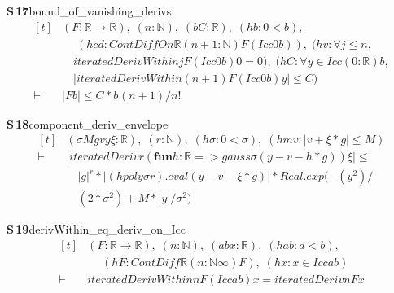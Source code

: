 \documentclass[conference]{IEEEtran}
\theoremstyle{definition}
\newcommand{\lean}[1]{\textsf{\footnotesize #1}}
\begin{document}
\noindent\textbf{S\,17}\quad\lean{bound\_of\_vanishing\_derivs}
{\footnotesize\[ \begin{aligned}[t]
&(\mathit{F} : \mathbb{R} \to \mathbb{R} ),\; (\mathit{n} : \mathbb{N} ),\; (\mathit{b} \mathit{C} : \mathbb{R} ),\; (\mathit{hb} : 0 < \mathit{b}),\\
&\quad \; (\mathit{hcd} : \mathit{ContDiffOn} \mathbb{R} (\mathit{n} + 1 : \mathbb{N} ) \mathit{F} (\mathit{Icc} 0 \mathit{b})),\; (\mathit{hv} : \forall \mathit{j} \leq \mathit{n},\\
&\quad \mathit{iteratedDerivWithin} \mathit{j} \mathit{F} (\mathit{Icc} 0 \mathit{b}) 0 = 0),\; (\mathit{hC} : \forall \mathit{y} \in \mathit{Icc} (0:\mathbb{R} ) \mathit{b},\\
&\quad |\mathit{iteratedDerivWithin} (\mathit{n} + 1) \mathit{F} (\mathit{Icc} 0 \mathit{b}) \mathit{y}| \leq \mathit{C})\\
\vdash\;&|\mathit{F} \mathit{b}| \leq \mathit{C} * \mathit{b} ^{} (\mathit{n} + 1) / \mathit{n} !
\end{aligned} \]}

\noindent\textbf{S\,18}\quad\lean{component\_deriv\_envelope}
{\footnotesize\[ \begin{aligned}[t]
&(\sigma \mathit{M} \mathit{g} \mathit{v} \mathit{y} \xi : \mathbb{R} ),\; (\mathit{r} : \mathbb{N} ),\; (\mathit{hσ} : 0 < \sigma ),\; (\mathit{hmv} : |\mathit{v} + \xi * \mathit{g}| \leq \mathit{M})\\
\vdash\;&|\mathit{iteratedDeriv} \mathit{r} (\mathbf{fun} \mathit{h} : \mathbb{R} => \mathit{gauss} \sigma (\mathit{y} - \mathit{v} - \mathit{h} * \mathit{g})) \xi | \leq\\
&\quad |\mathit{g}| ^{\mathit{r}} * |(\mathit{hpoly} \sigma \mathit{r}).\mathit{eval} (\mathit{y} - \mathit{v} - \xi * \mathit{g})| * \mathit{Real}.\mathit{exp} (-(\mathit{y} ^{2}) /\\
&\quad (2 * \sigma ^{2}) + \mathit{M} * |\mathit{y}| / \sigma ^{2})
\end{aligned} \]}

\noindent\textbf{S\,19}\quad\lean{derivWithin\_eq\_deriv\_on\_Icc}
{\footnotesize\[ \begin{aligned}[t]
&(\mathit{F} : \mathbb{R} \to \mathbb{R} ),\; (\mathit{n} : \mathbb{N} ),\; (\mathit{a} \mathit{b} \mathit{x} : \mathbb{R} ),\; (\mathit{hab} : \mathit{a} < \mathit{b}),\\
&\quad \; (\mathit{hF} : \mathit{ContDiff} \mathbb{R} (\mathit{n} : \mathbb{N} \infty ) \mathit{F}),\; (\mathit{hx} : \mathit{x} \in \mathit{Icc} \mathit{a} \mathit{b})\\
\vdash\;&\mathit{iteratedDerivWithin} \mathit{n} \mathit{F} (\mathit{Icc} \mathit{a} \mathit{b}) \mathit{x} = \mathit{iteratedDeriv} \mathit{n} \mathit{F} \mathit{x}
\end{aligned} \]}
\end{document}
